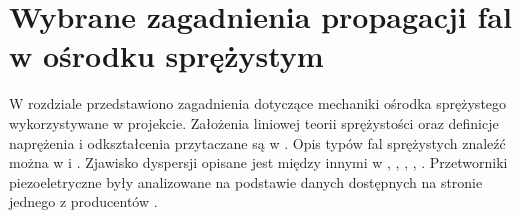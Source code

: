 \chapter{Wybrane zagadnienia propagacji fal w ośrodku sprężystym}
\label{cha:wybrane_zagadnienia_propagacji_fal_w_osrodku_sprezystym}

W rozdziale przedstawiono zagadnienia dotyczące mechaniki ośrodka sprężystego wykorzystywane w projekcie. Założenia liniowej teorii sprężystości oraz definicje naprężenia i odkształcenia przytaczane są w \cite{bartek_wolny}. Opis typów fal sprężystych znaleźć można w \cite{bartek_rose} i \cite{bartek_nazarchuk}. Zjawisko dyspersji opisane jest między innymi w \cite{bartek_rose}, \cite{bartek_feruza}, \cite{bartek_cervena}, \cite{bartek_tian}, \cite{bartek_valsamos}. Przetworniki piezoeletryczne były analizowane na podstawie danych dostępnych na stronie jednego z producentów \cite{bartek_piezo}.





























